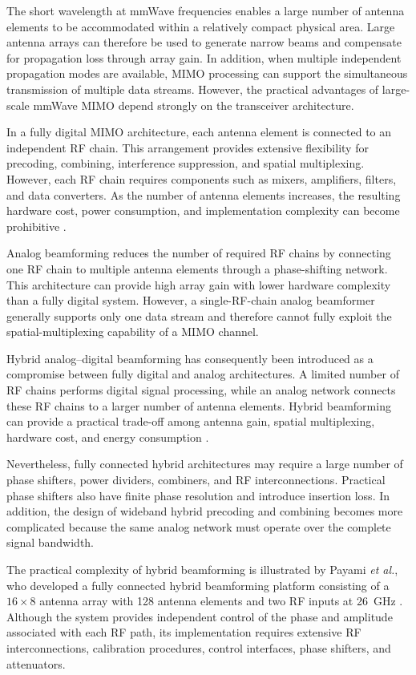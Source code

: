 The short wavelength at mmWave frequencies enables a large number of
antenna elements to be accommodated within a relatively compact
physical area. Large antenna arrays can therefore be used to generate
narrow beams and compensate for propagation loss through array
gain. In addition, when multiple independent propagation modes are
available, MIMO processing can support the simultaneous transmission
of multiple data streams. However, the practical advantages of
large-scale mmWave MIMO depend strongly on the transceiver
architecture.

In a fully digital MIMO architecture, each antenna element is connected
to an independent RF chain. This arrangement provides extensive
flexibility for precoding, combining, interference suppression, and
spatial multiplexing. However, each RF chain requires components such
as mixers, amplifiers, filters, and data converters. As the number of
antenna elements increases, the resulting hardware cost, power
consumption, and implementation complexity can become prohibitive
\cite{Payami2020,Zeng2018}.

Analog beamforming reduces the number of required RF chains by
connecting one RF chain to multiple antenna elements through a
phase-shifting network. This architecture can provide high array gain
with lower hardware complexity than a fully digital system. However,
a single-RF-chain analog beamformer generally supports only one data
stream and therefore cannot fully exploit the spatial-multiplexing
capability of a MIMO channel.

Hybrid analog--digital beamforming has consequently been introduced as
a compromise between fully digital and analog architectures. A
limited number of RF chains performs digital signal processing, while
an analog network connects these RF chains to a larger number of
antenna elements. Hybrid beamforming can provide a practical trade-off
among antenna gain, spatial multiplexing, hardware cost, and energy
consumption \cite{Payami2020}.

Nevertheless, fully connected hybrid architectures may require a
large number of phase shifters, power dividers, combiners, and RF
interconnections. Practical phase shifters also have finite phase
resolution and introduce insertion loss. In addition, the design of
wideband hybrid precoding and combining becomes more complicated
because the same analog network must operate over the complete signal
bandwidth.

The practical complexity of hybrid beamforming is illustrated by
Payami \textit{et al.}, who developed a fully connected hybrid
beamforming platform consisting of a $16\times8$ antenna array with
128 antenna elements and two RF inputs at 26~GHz
\cite{Payami2020}. Although the system provides independent
control of the phase and amplitude associated with each RF path, its
implementation requires extensive RF interconnections, calibration
procedures, control interfaces, phase shifters, and attenuators.

